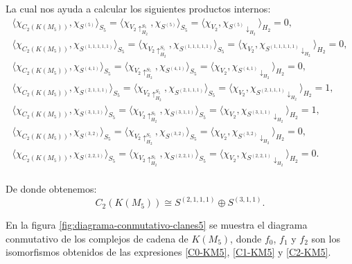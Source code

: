 \documentclass[12pt]{book}
\theoremstyle{definition}
\newcounter{in}
\begin{document}
La cual nos ayuda a calcular los siguientes productos internos:
\begin{eqnarray*}
  \langle\chi_{C_{2}(K(M_{5}))},\chi_{S^{(5)}}\rangle_{S_{5}}=\langle\chi_{V_{2}\uparrow^{S_{5}}_{H_{2}}},\chi_{S^{(5)}}\rangle_{S_{5}}=\langle\chi_{V_{2}},\chi_{S^{(5)}\downarrow_{H_{2}}}\rangle_{H_{2}}=0,\\
  \langle\chi_{C_{2}(K(M_{5}))},\chi_{S^{(1,1,1,1,1)}}\rangle_{S_{5}}=\langle\chi_{V_{2}\uparrow^{S_{5}}_{H_{2}}},\chi_{S^{(1,1,1,1,1)}}\rangle_{S_{5}}=\langle\chi_{V_{2}},\chi_{S^{(1,1,1,1,1)}\downarrow_{H_{2}}}\rangle_{H_{2}}=0,\\
  \langle\chi_{C_{2}(K(M_{5}))},\chi_{S^{(4,1)}}\rangle_{S_{5}}=\langle\chi_{V_{2}\uparrow^{S_{5}}_{H_{2}}},\chi_{S^{(4,1)}}\rangle_{S_{5}}=\langle\chi_{V_{2}},\chi_{S^{(4,1)}\downarrow_{H_{2}}}\rangle_{H_{2}}=0,\\
  \langle\chi_{C_{2}(K(M_{5}))},\chi_{S^{(2,1,1,1)}}\rangle_{S_{5}}=\langle\chi_{V_{2}\uparrow^{S_{5}}_{H_{2}}},\chi_{S^{(2,1,1,1)}}\rangle_{S_{5}}=\langle\chi_{V_{2}},\chi_{S^{(2,1,1,1)}\downarrow_{H_{2}}}\rangle_{H_{2}}=1,\\
  \langle\chi_{C_{2}(K(M_{5}))},\chi_{S^{(3,1,1)}}\rangle_{S_{5}}=\langle\chi_{V_{2}\uparrow^{S_{5}}_{H_{2}}},\chi_{S^{(3,1,1)}}\rangle_{S_{5}}=\langle\chi_{V_{2}},\chi_{S^{(3,1,1)}\downarrow_{H_{2}}}\rangle_{H_{2}}=1,\\
  \langle\chi_{C_{2}(K(M_{5}))},\chi_{S^{(3,2)}}\rangle_{S_{5}}=\langle\chi_{V_{2}\uparrow^{S_{5}}_{H_{2}}},\chi_{S^{(3,2)}}\rangle_{S_{5}}=\langle\chi_{V_{2}},\chi_{S^{(3,2)}\downarrow_{H_{2}}}\rangle_{H_{2}}=0,\\
  \langle\chi_{C_{2}(K(M_{5}))},\chi_{S^{(2,2,1)}}\rangle_{S_{5}}=\langle\chi_{V_{2}\uparrow^{S_{5}}_{H_{2}}},\chi_{S^{(2,2,1)}}\rangle_{S_{5}}=\langle\chi_{V_{2}},\chi_{S^{(2,2,1)}\downarrow_{H_{2}}}\rangle_{H_{2}}=0.\\
\end{eqnarray*}

De donde obtenemos:
\begin{equation}
  \label{C2-KM5}
  C_{2}(K(M_{5}))\cong S^{(2,1,1,1)}\oplus S^{(3,1,1)}.
\end{equation}

En la figura \ref{fig:diagrama-conmutativo-clanes5} se muestra el diagrama
conmutativo de los complejos de cadena de $K(M_{5})$, donde $f_{0}$,
$f_{1}$ y $f_{2}$ son los isomorfismos obtenidos de las expresiones
\ref{C0-KM5}, \ref{C1-KM5} y \ref{C2-KM5}.
\end{document}
